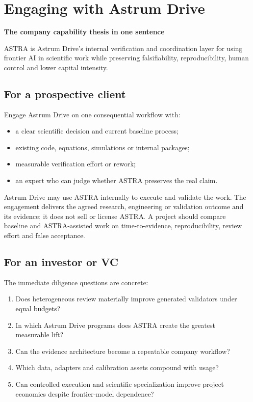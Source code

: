 \documentclass[10pt,a4paper]{article}
\begin{document}
\section*{Engaging with Astrum Drive}

\begin{darkbox}
{\Large\bfseries The company capability thesis in one sentence}\par
\vspace{2mm}
ASTRA is Astrum Drive's internal verification and coordination layer for using
frontier AI in scientific work while preserving falsifiability, reproducibility,
human control and lower capital intensity.
\end{darkbox}

\subsection*{For a prospective client}

Engage Astrum Drive on one consequential workflow with:

\begin{itemize}
  \item a clear scientific decision and current baseline process;
  \item existing code, equations, simulations or internal packages;
  \item measurable verification effort or rework;
  \item an expert who can judge whether ASTRA preserves the real claim.
\end{itemize}

Astrum Drive may use ASTRA internally to execute and validate the work. The engagement
delivers the agreed research, engineering or validation outcome and its evidence; it
does not sell or license ASTRA. A project should compare baseline and ASTRA-assisted
work on time-to-evidence, reproducibility, review effort and false acceptance.

\subsection*{For an investor or VC}

The immediate diligence questions are concrete:

\begin{enumerate}
  \item Does heterogeneous review materially improve generated validators under equal budgets?
  \item In which Astrum Drive programs does ASTRA create the greatest measurable lift?
  \item Can the evidence architecture become a repeatable company workflow?
  \item Which data, adapters and calibration assets compound with usage?
  \item Can controlled execution and scientific specialization improve project
  economics despite frontier-model dependence?
\end{enumerate}
\end{document}
